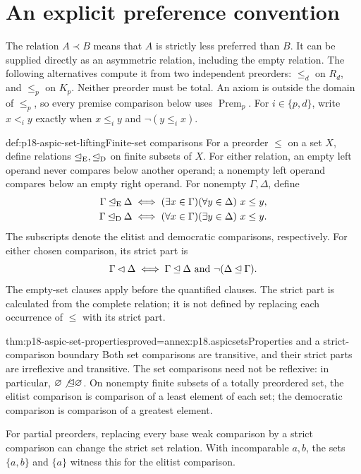 \section{An explicit preference convention}

The relation \(A\prec B\) means that \(A\) is strictly less preferred
than \(B\). It can be supplied directly as an asymmetric relation, including
the empty relation. The following alternatives compute it from two
independent preorders: \(\leq_d\) on \(R_d\), and \(\leq_p\) on \(K_p\).
Neither preorder must be total. An axiom is outside the domain of
\(\leq_p\), so every premise comparison below uses
\(\operatorname{Prem}_p\).
For \(i\in\{p,d\}\), write \(x<_i y\) exactly when
\(x\leq_i y\) and \(\neg(y\leq_i x)\).

\begin{hbdefinition}{def:p18-aspic-set-lifting}{Finite-set comparisons}
For a preorder \(\leq\) on a set \(X\), define relations
\(\unlhd_{\rm E},\unlhd_{\rm D}\) on finite subsets of \(X\).
For either relation, an empty left operand never compares below another
operand; a nonempty left operand compares below an empty right operand.
For nonempty \(\Gamma,\Delta\), define
\[
\begin{split}
 \Gamma\unlhd_{\rm E}\Delta
   &\iff (\exists x\in\Gamma)(\forall y\in\Delta)\ x\leq y,\\
 \Gamma\unlhd_{\rm D}\Delta
   &\iff (\forall x\in\Gamma)(\exists y\in\Delta)\ x\leq y .
\end{split}
\]
The subscripts denote the elitist and democratic comparisons, respectively.
For either chosen comparison, its strict part is
\[
 \Gamma\lhd\Delta
 \iff \Gamma\unlhd\Delta\ \hbox{and}\ \neg(\Delta\unlhd\Gamma).
\]
The empty-set clauses apply before the quantified clauses.
The strict part is calculated from the complete relation; it is not defined
by replacing each occurrence of \(\leq\) with its strict part.
\end{hbdefinition}

\begin{hbtheorem}{thm:p18-aspic-set-properties}{proved=annex:p18.aspicsets}{Properties and a strict-comparison boundary}
Both set comparisons are transitive, and their strict parts are irreflexive
and transitive. The set comparisons need not be reflexive:
in particular, \(\varnothing\not\unlhd\varnothing\).
On nonempty finite subsets of a totally preordered set, the elitist
comparison is comparison of a least element of each set; the democratic
comparison is comparison of a greatest element.

For partial preorders, replacing every base weak comparison by a strict
comparison can change the strict set relation. With incomparable
\(a,b\), the sets \(\{a,b\}\) and \(\{a\}\) witness this for the elitist
comparison.
\end{hbtheorem}

